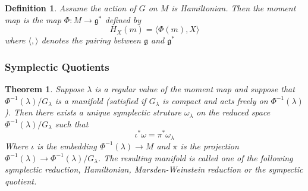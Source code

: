 \documentclass{article}
\newtheorem{thm}{Theorem}
\newtheorem{defn}{Definition}
\begin{document}
\begin{defn}

Assume the action of $G$ on $M$ is Hamiltonian. Then the moment map is the map $ \Phi: M \to \mathfrak{g}^*$ defined by 
\[
	H_X(m) = \langle \Phi(m), X  \rangle
\]
where $ \langle , \rangle $ denotes the pairing between $ \mathfrak{g}$ and $ \mathfrak{g}^*$

\end{defn}

\subsubsection{Symplectic Quotients}

\begin{thm}

	Suppose $ \lambda$ is a regular value of the moment map and suppose that $ \Phi^{-1}( \lambda) / G_{ \lambda}$ is a manifold (satisfied if $G_{ \lambda}$ is compact and acts freely on  $ \Phi^{-1}( \lambda)$). Then there exists a unique symplectic struture $ \omega_{ \lambda}$ on the reduced space $ \Phi^{-1}( \lambda ) / G_{ \lambda }$ such that
	\[
	\iota^* \omega = \pi^* \omega_{ \lambda }
	\]
	Where $ \iota$ is the embedding $ \Phi^{-1}( \lambda) \to M$ and $ \pi$ is the projection $ \Phi^{-1}( \lambda ) \to \Phi^{-1}( \lambda) / G_{ \lambda }$. The resulting manifold is called one of the following \textit{symplectic reduction, Hamiltonian, Marsden-Weinstein reduction} or the \textit{sympectic quotient}.

\end{thm}
\end{document}
